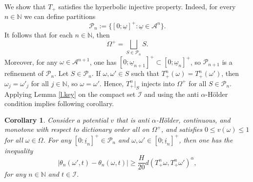 \documentclass{amsart}
\newtheorem{corollary}{Corollary}
\newcommand{\NN}{\mathbb{N}}
\newcommand{\A}{\mathcal{A}}
\newcommand{\I}{\mathcal{I}}
\renewcommand{\P}{\mathcal{P}}
\begin{document}
We show that $T_+$ satisfies the hyperbolic injective property. Indeed, for every $n\in \NN$ we can define partitions 
\[\P_n := \{[0;\underline{\omega}]^+: \underline{\omega}\in \A^n\}.\]
It follows that for each $n\in \NN$, then
\[\Omega^+ = \bigsqcup_{S\in \P_n} S.\]
Moreover, for any $\omega\in \A^{n+1}$, one has $[0;\underline{\omega}_{n+1}]^+ \subset [0;\underline{\omega}_n]^+$, so $\P_{n+1}$ is a refinement of $\P_n$. Let $S\in \P_n$. If $\omega,\omega'\in S$ such that $T^n_+(\omega) = T^n_+(\omega')$, then $\omega_j = \omega'_j$ for all $j\in \NN$, so $\omega = \omega'$. Hence, $T^n_+|_S$ injects into $\Omega^+$ for all $S\in \P_n$. Applying Lemma \ref{l.key} on the compact set $\I$ and using the anti $\alpha$-H\"older condition implies following corollary.

\begin{corollary}\label{c.thetarelatecylinder}
    Consider a potential $v$ that is anti $\alpha$-H\"older, continuous, and monotone with respect to dictionary order all on $\Omega^+$, and satisfies $0\leq v(\omega)\leq 1$ for all $\omega\in \Omega$. For any $[0:\underline{i}_n]^+\in \P_n$ and $\omega,\omega'\in [0;\underline{i}_n]^+$, then one has the inequality
    \begin{equation}
        |\theta_n(\omega', t) - \theta_n(\omega, t)|\geq \frac{H}{20}d(T^n_+\omega,T^n_+\omega')^\alpha,
    \end{equation}
    for any $n\in \NN$ and $t\in \I$.
\end{corollary}
 
\end{document}
